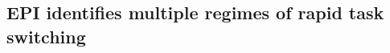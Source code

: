 \documentclass[11pt]{article}
\begin{document}
\subsection{EPI identifies multiple regimes of rapid task switching} \label{results_SC}
%
\end{document}
